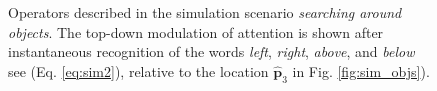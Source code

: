 \documentclass[letterpaper, 10 pt, conference]{ieeeconf}  %
\begin{document}
	\begin{figure}[h!]
		\begin{center}
			
		\end{center}
		\caption{Operators described in the simulation scenario \textit{searching around objects}. The top-down modulation of attention is shown after instantaneous recognition of the words \textit{left}, \textit{right}, \textit{above}, and \textit{below} see (Eq. \eqref{eq:sim2}), relative to the location $\mathbf{\hat{p}}_3$ in Fig. \ref{fig:sim_objs}).}
	\label{fig:sim2}
	\end{figure}
\end{document}
